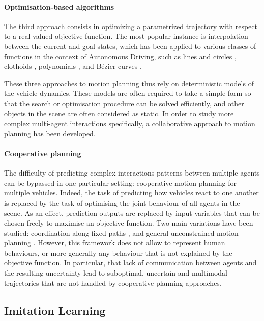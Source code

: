 \paragraph{Optimisation-based algorithms}

The third approach consists in optimizing a parametrized trajectory with respect to a real-valued objective function. The most popular instance is interpolation between the current and goal states, which has been applied to various classes of functions in the context of Autonomous Driving, such as lines and circles \citep{Reeds1990}, clothoids \citep{Funke2012}, polynomials \citep{Xu2012}, and Bézier curves \citep{Gonzalez2016}.

These three approaches to motion planning thus rely on deterministic models of the vehicle dynamics. These models are often required to take a simple form so that the search or optimisation procedure can be solved efficiently, and other objects in the scene are often considered as static. In order to study more complex multi-agent interactions specifically, a collaborative approach to motion planning has been developed.

\paragraph{Cooperative planning}

The difficulty of predicting complex interactions patterns between multiple agents can be bypassed in one particular setting: cooperative motion planning for multiple vehicles. Indeed, the task of predicting how vehicles react to one another is replaced by the task of optimising the joint behaviour of all agents in the scene. As an effect, prediction outputs are replaced by input variables that can be chosen freely to maximise an objective function. Two main variations have been studied: coordination along fixed paths \citep{Altche2016,Altche2016b,Altche2017}, and general unconstrained motion planning \citep{LaValle1998}.
However, this framework does not allow to represent human behaviours, or more generally any behaviour that is not explained by the objective function. In particular, that lack of communication between agents and the resulting uncertainty lead to suboptimal, uncertain and multimodal trajectories that are not handled by cooperative planning approaches.


\subsection{Imitation Learning}

